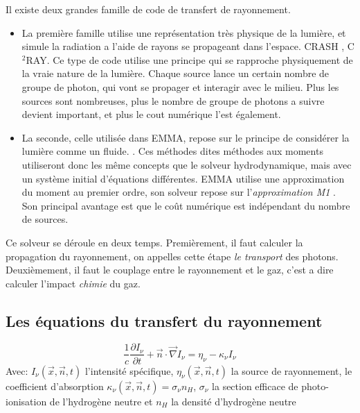 Il existe deux grandes famille de code de transfert de rayonnement.
\begin{itemize}
\item La première famille utilise une représentation très physique de la lumière, et simule la radiation a l'aide de rayons se propageant dans l'espace.
CRASH \citep{2003MNRAS.345..379M}, C$^2$RAY\citep{2006NewA...11..374M}.
Ce type de code utilise une principe qui se rapproche physiquement de la vraie nature de la lumière.
Chaque source lance un certain nombre de groupe de photon, qui vont se propager et interagir avec le milieu.
Plus les sources sont nombreuses, plus le nombre de groupe de photons a suivre devient important, et plus le cout numérique l'est également.

\item La seconde, celle utilisée dans EMMA, repose sur le principe de considérer la lumière comme un fluide. \citep{gnedin_multi-dimensional_2001, aubert_radiative_2008}.
Ces méthodes dites méthodes aux moments utiliseront donc les même concepts que le solveur hydrodynamique, mais avec un système initial d'équations différentes. 
EMMA utilise une approximation du moment au premier ordre, son solveur repose sur l'\textit{approximation M1} \citep{levermore_relating_1984}.
Son principal avantage est que le coût numérique est indépendant du nombre de sources.
\end{itemize}

Ce solveur se déroule en deux temps.
Premièrement, il faut calculer la propagation du rayonnement, on appelles cette étape \textit{le transport} des photons.
Deuxièmement, il faut le couplage entre le rayonnement et le gaz, c'est a dire calculer l'impact \textit{chimie} du gaz.


\subsection{Les équations du transfert du rayonnement}
\begin{equation}
\frac{1}{c} \frac{\partial I_\nu}{\partial t} + \vec{n}\cdot \vec{\nabla} I_\nu = \eta_\nu - \kappa_\nu I_\nu 
\end{equation}
Avec: $I_\nu(\vec{x},\vec{n},t)$ l'intensité spécifique,
$\eta_\nu(\vec{x},\vec{n},t)$ la source de rayonnement,
le coefficient d'absorption $\kappa_\nu(\vec{x},\vec{n},t) = \sigma_\nu n_H$, 
$\sigma_\nu$ la section efficace de photo-ionisation de l'hydrogène neutre et $n_H$ la densité d'hydrogène neutre


